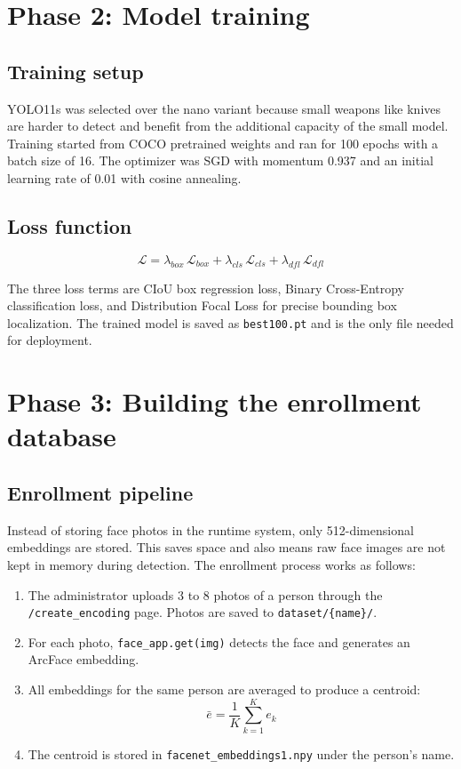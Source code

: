 \documentclass[12pt,a4paper]{report}
\begin{document}
\section{Phase 2: Model training}

\subsection{Training setup}

YOLO11s was selected over the nano variant because small weapons like knives are harder to detect and benefit from the additional capacity of the small model. Training started from COCO pretrained weights and ran for 100 epochs with a batch size of 16. The optimizer was SGD with momentum 0.937 and an initial learning rate of 0.01 with cosine annealing.

\subsection{Loss function}

\[
\mathcal{L} = \lambda_{box}\,\mathcal{L}_{box} + \lambda_{cls}\,\mathcal{L}_{cls} + \lambda_{dfl}\,\mathcal{L}_{dfl}
\]

The three loss terms are CIoU box regression loss, Binary Cross-Entropy classification loss, and Distribution Focal Loss for precise bounding box localization. The trained model is saved as \texttt{best100.pt} and is the only file needed for deployment.

\section{Phase 3: Building the enrollment database}

\subsection{Enrollment pipeline}

Instead of storing face photos in the runtime system, only 512-dimensional embeddings are stored. This saves space and also means raw face images are not kept in memory during detection. The enrollment process works as follows:

\begin{enumerate}
    \item The administrator uploads 3 to 8 photos of a person through the \texttt{/create\_encoding} page. Photos are saved to \texttt{dataset/\{name\}/}.
    \item For each photo, \texttt{face\_app.get(img)} detects the face and generates an ArcFace embedding.
    \item All embeddings for the same person are averaged to produce a centroid:
    \[
    \bar{e} = \frac{1}{K} \sum_{k=1}^{K} e_k
    \]
    \item The centroid is stored in \texttt{facenet\_embeddings1.npy} under the person's name.
\end{enumerate}
\end{document}

